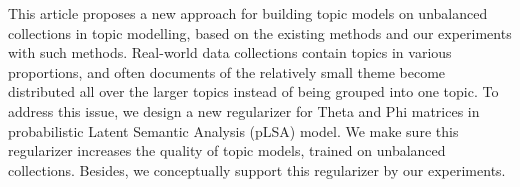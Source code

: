 This article proposes a new approach for building topic models on unbalanced collections in topic modelling, based on the existing methods and our experiments with such methods. Real-world data collections contain topics in various proportions, and often documents of the relatively small theme become distributed all over the larger topics instead of being grouped into one topic. To address this issue, we design a new regularizer for Theta and Phi matrices in probabilistic Latent Semantic Analysis (pLSA) model. We make sure this regularizer increases the quality of topic models, trained on unbalanced collections. Besides, we conceptually support this regularizer by our experiments.
